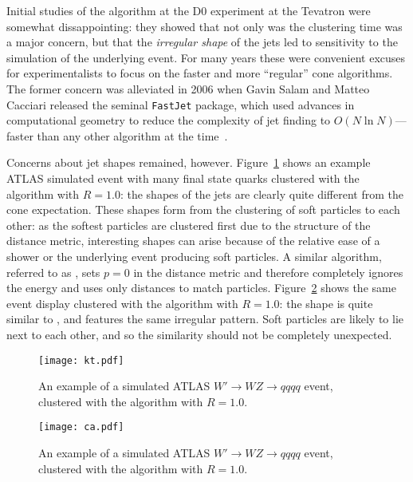 Initial studies of the \kt algorithm at the D0 experiment at the Tevatron were somewhat dissappointing: they showed that not only was the clustering time was a major concern, but that the \textit{irregular shape} of the \kt jets led to sensitivity to the simulation of the underlying event. For many years these were convenient excuses for experimentalists to focus on the faster and more ``regular'' cone algorithms. The former concern was alleviated in 2006 when Gavin Salam and Matteo Cacciari released the seminal \texttt{FastJet} package, which used advances in computational geometry to reduce the complexity of \kt jet finding to $O(N \ln N)$--- faster than any other algorithm at the time~\cite{fj}. 

Concerns about jet shapes remained, however. Figure~\ref{fig:jets:kt} shows an example ATLAS simulated event with many final state quarks clustered with the \kt algorithm with $R=1.0$: the shapes of the jets are clearly quite different from the cone expectation. These shapes form from the clustering of soft particles to each other: as the softest particles are clustered first due to the structure of the distance metric, interesting shapes can arise because of the relative ease of a shower or the underlying event producing soft particles. A similar algorithm, referred to as \CA, sets $p=0$ in the distance metric and therefore completely ignores the energy and uses only distances to match particles. Figure~\ref{fig:jets:ca} shows the same event display clustered with the \CA algorithm with $R=1.0$: the shape is quite similar to \kt, and features the same irregular pattern. Soft particles are likely to lie next to each other, and so the similarity should not be completely unexpected.  %


\begin{figure}
\centering
\texttt{[image: kt.pdf]}
\label{fig:jets:kt}
\caption{An example of a simulated ATLAS $W'\rightarrow WZ\rightarrow qqqq$ event, clustered with the \kt algorithm with $R=1.0$.}
\end{figure}



\begin{figure}
\centering
\texttt{[image: ca.pdf]}
\label{fig:jets:ca}
\caption{An example of a simulated ATLAS $W'\rightarrow WZ\rightarrow qqqq$ event, clustered with the \CA algorithm with $R=1.0$.}
\end{figure}

